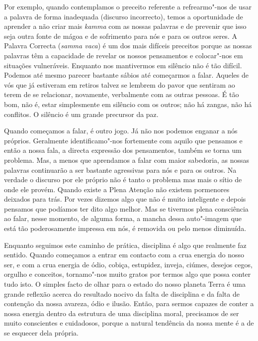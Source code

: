 Por exemplo, quando contemplamos o preceito referente a refrearmo"-nos de
usar a palavra de forma inadequada (discurso incorrecto), temos a
oportunidade de aprender a não criar mais \emph{kamma} com as nossas
palavras e de prevenir que isso seja outra fonte de mágoa e de
sofrimento para nós e para os outros seres. A Palavra Correcta
(\emph{samma vaca}) é um dos mais difíceis preceitos porque as nossas
palavras têm a capacidade de revelar os nossos pensamentos e colocar"-nos
em situações vulneráveis. Enquanto nos mantivermos em silêncio não é tão
difícil. Podemos até mesmo parecer bastante sábios até começarmos a
falar. Aqueles de vós que já estiveram em retiros talvez se lembrem do
pavor que sentiram ao terem de se relacionar, novamente, verbalmente com
as outras pessoas. É tão bom, não é, estar simplesmente em silêncio com
os outros; não há zangas, não há conflitos. O silêncio é um grande
precursor da paz.

Quando começamos a falar, é outro jogo. Já não nos podemos enganar a nós
próprios. Geralmente identificamo"-nos fortemente com aquilo que pensamos
e então a nossa fala, a directa expressão dos pensamentos, também se
torna um problema. Mas, a menos que aprendamos a falar com maior
sabedoria, as nossas palavras continuarão a ser bastante agressivas para
nós e para os outros. Na verdade o discurso por ele próprio não é tanto
o problema mas mais o sítio de onde ele provém. Quando existe a Plena
Atenção não existem pormenores deixados para trás. Por vezes dizemos
algo que não é muito inteligente e depois pensamos que podíamos ter dito
algo melhor. Mas se tivermos plena consciência ao falar, nesse momento,
de alguma forma, a mancha dessa auto"-imagem que está tão poderosamente
impressa em nós, é removida ou pelo menos diminuída.

Enquanto seguimos este caminho de prática, disciplina é algo que
realmente faz sentido. Quando começamos a entrar em contacto com a crua
energia do nosso ser, e com a crua energia de ódio, cobiça, estupidez,
inveja, ciúmes, desejos cegos, orgulho e conceitos, tornamo"-nos muito
gratos por termos algo que possa conter tudo isto. O simples facto de
olhar para o estado do nosso planeta Terra é uma grande reflexão acerca
do resultado nocivo da falta de disciplina e da falta de contenção da
nossa avareza, ódio e ilusão. Então, para sermos capazes de conter a
nossa energia dentro da estrutura de uma disciplina moral, precisamos de
ser muito conscientes e cuidadosos, porque a natural tendência da nossa
mente é a de se esquecer dela própria.

